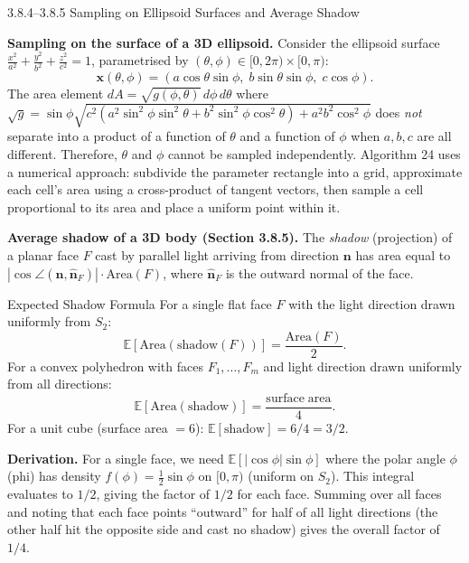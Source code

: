 \documentclass[aspectratio=169,10pt]{beamer}
\newcommand{\EE}{\mathbb{E}}
\begin{document}
\begin{frame}[allowframebreaks]{3.8.4--3.8.5 Sampling on Ellipsoid Surfaces and Average Shadow}

\textbf{Sampling on the surface of a 3D ellipsoid.}
Consider the ellipsoid surface
$\frac{x^2}{a^2} + \frac{y^2}{b^2} + \frac{z^2}{c^2} = 1$,
parametrised by $(\theta, \phi) \in [0,2\pi) \times [0,\pi)$:
\[
  \mathbf{x}(\theta,\phi) = (a\cos\theta\sin\phi,\; b\sin\theta\sin\phi,\; c\cos\phi).
\]
The area element $dA = \sqrt{g(\phi,\theta)}\,d\phi\,d\theta$ where
$\sqrt{g} = \sin\phi\sqrt{c^2(a^2\sin^2\phi\sin^2\theta + b^2\sin^2\phi\cos^2\theta) + a^2 b^2 \cos^2\phi}$
does \emph{not} separate into a product of a function of $\theta$ and a function of
$\phi$ when $a, b, c$ are all different.  Therefore, $\theta$ and $\phi$ cannot
be sampled independently.  Algorithm 24 uses a numerical approach: subdivide the
parameter rectangle into a grid, approximate each cell's area using a cross-product
of tangent vectors, then sample a cell proportional to its area and place a uniform
point within it.

\textbf{Average shadow of a 3D body (Section 3.8.5).}
The \emph{shadow} (projection) of a planar face $F$ cast by parallel light arriving
from direction $\mathbf{n}$ has area equal to $|\cos\angle(\mathbf{n}, \hat{\mathbf{n}}_F)| \cdot \mathrm{Area}(F)$,
where $\hat{\mathbf{n}}_F$ is the outward normal of the face.

\begin{block}{Expected Shadow Formula}
  For a single flat face $F$ with the light direction drawn uniformly from $S_2$:
  \[
    \EE[\mathrm{Area}(\mathrm{shadow}(F))] = \frac{\mathrm{Area}(F)}{2}.
  \]
  For a convex polyhedron with faces $F_1, \ldots, F_m$ and light direction drawn
  uniformly from all directions:
  \[
    \EE[\mathrm{Area}(\mathrm{shadow})] = \frac{\mathrm{surface\;area}}{4}.
  \]
  For a unit cube (surface area $= 6$): $\EE[\mathrm{shadow}] = 6/4 = 3/2$.
\end{block}

\textbf{Derivation.}  For a single face, we need $\EE[|\cos\phi|\sin\phi]$ where
the polar angle $\phi$ (phi) has density $f(\phi) = \frac{1}{2}\sin\phi$ on
$[0,\pi)$ (uniform on $S_2$).  This integral evaluates to $1/2$, giving the
factor of $1/2$ for each face.  Summing over all faces and noting that each face
points ``outward'' for half of all light directions (the other half hit the opposite
side and cast no shadow) gives the overall factor of $1/4$.

\end{frame}
\end{document}
